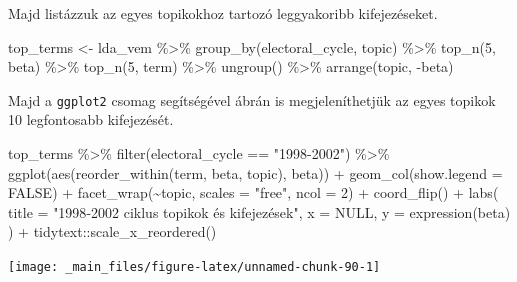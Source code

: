 \documentclass[
]{book}
\newenvironment{Shaded}{\begin{snugshade}}{\end{snugshade}}
\newcommand{\AttributeTok}[1]{\textcolor[rgb]{0.77,0.63,0.00}{#1}}
\newcommand{\ConstantTok}[1]{\textcolor[rgb]{0.00,0.00,0.00}{#1}}
\newcommand{\DecValTok}[1]{\textcolor[rgb]{0.00,0.00,0.81}{#1}}
\newcommand{\FunctionTok}[1]{\textcolor[rgb]{0.00,0.00,0.00}{#1}}
\newcommand{\NormalTok}[1]{#1}
\newcommand{\OtherTok}[1]{\textcolor[rgb]{0.56,0.35,0.01}{#1}}
\newcommand{\SpecialCharTok}[1]{\textcolor[rgb]{0.00,0.00,0.00}{#1}}
\newcommand{\StringTok}[1]{\textcolor[rgb]{0.31,0.60,0.02}{#1}}
\begin{document}
Majd listázzuk az egyes topikokhoz tartozó leggyakoribb kifejezéseket.

\begin{Shaded}
\begin{Highlighting}[]

\NormalTok{top\_terms }\OtherTok{\textless{}{-}}\NormalTok{ lda\_vem }\SpecialCharTok{\%\textgreater{}\%}
  \FunctionTok{group\_by}\NormalTok{(electoral\_cycle, topic) }\SpecialCharTok{\%\textgreater{}\%}
  \FunctionTok{top\_n}\NormalTok{(}\DecValTok{5}\NormalTok{, beta) }\SpecialCharTok{\%\textgreater{}\%}
  \FunctionTok{top\_n}\NormalTok{(}\DecValTok{5}\NormalTok{, term) }\SpecialCharTok{\%\textgreater{}\%}
  \FunctionTok{ungroup}\NormalTok{() }\SpecialCharTok{\%\textgreater{}\%}
  \FunctionTok{arrange}\NormalTok{(topic, }\SpecialCharTok{{-}}\NormalTok{beta)}
\end{Highlighting}
\end{Shaded}

Majd a \texttt{ggplot2} csomag segítségével ábrán is megjeleníthetjük az
egyes topikok 10 legfontosabb kifejezését.

\begin{Shaded}
\begin{Highlighting}[]
\NormalTok{top\_terms }\SpecialCharTok{\%\textgreater{}\%}
  \FunctionTok{filter}\NormalTok{(electoral\_cycle }\SpecialCharTok{==} \StringTok{"1998{-}2002"}\NormalTok{) }\SpecialCharTok{\%\textgreater{}\%}
  \FunctionTok{ggplot}\NormalTok{(}\FunctionTok{aes}\NormalTok{(}\FunctionTok{reorder\_within}\NormalTok{(term, beta, topic), beta)) }\SpecialCharTok{+}
  \FunctionTok{geom\_col}\NormalTok{(}\AttributeTok{show.legend =} \ConstantTok{FALSE}\NormalTok{) }\SpecialCharTok{+}
  \FunctionTok{facet\_wrap}\NormalTok{(}\SpecialCharTok{\textasciitilde{}}\NormalTok{topic, }\AttributeTok{scales =} \StringTok{"free"}\NormalTok{, }\AttributeTok{ncol =} \DecValTok{2}\NormalTok{) }\SpecialCharTok{+}
  \FunctionTok{coord\_flip}\NormalTok{() }\SpecialCharTok{+}
  \FunctionTok{labs}\NormalTok{(}
    \AttributeTok{title =} \StringTok{"1998{-}2002 ciklus topikok és kifejezések"}\NormalTok{,}
    \AttributeTok{x =} \ConstantTok{NULL}\NormalTok{,}
    \AttributeTok{y =} \FunctionTok{expression}\NormalTok{(beta)}
\NormalTok{  ) }\SpecialCharTok{+}
\NormalTok{  tidytext}\SpecialCharTok{::}\FunctionTok{scale\_x\_reordered}\NormalTok{()}
\end{Highlighting}
\end{Shaded}

\begin{center}\texttt{[image: \_main\_files/figure-latex/unnamed-chunk-90-1]} \end{center}
\end{document}
